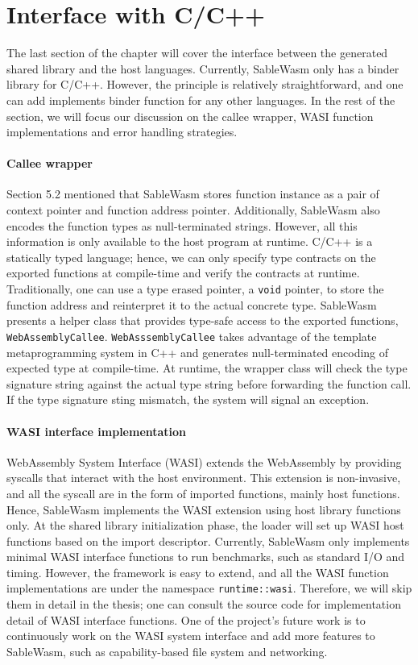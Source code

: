 \section{Interface with C/C++}
The last section of the chapter will cover the interface between the generated shared library and the host languages. Currently, SableWasm only has a binder library for C/C++. However, the principle is relatively straightforward, and one can add implements binder function for any other languages. In the rest of the section, we will focus our discussion on the callee wrapper, WASI function implementations and error handling strategies.

\paragraph{Callee wrapper}
Section 5.2 mentioned that SableWasm stores function instance as a pair of context pointer and function address pointer. Additionally, SableWasm also encodes the function types as null-terminated strings. However, all this information is only available to the host program at runtime. C/C++ is a statically typed language; hence, we can only specify type contracts on the exported functions at compile-time and verify the contracts at runtime. Traditionally, one can use a type erased pointer, a \texttt{void} pointer, to store the function address and reinterpret it to the actual concrete type.  SableWasm presents a helper class that provides type-safe access to the exported functions, \texttt{WebAssemblyCallee}. \texttt{WebAsssemblyCallee} takes advantage of the template metaprogramming system in C++ and generates null-terminated encoding of expected type at compile-time. At runtime, the wrapper class will check the type signature string against the actual type string before forwarding the function call. If the type signature sting mismatch, the system will signal an exception.

\paragraph{WASI interface implementation}
WebAssembly System Interface (WASI) extends the WebAssembly by providing syscalls that interact with the host environment. This extension is non-invasive, and all the syscall are in the form of imported functions, mainly host functions. Hence, SableWasm implements the WASI extension using host library functions only. At the shared library initialization phase, the loader will set up WASI host functions based on the import descriptor. Currently, SableWasm only implements minimal WASI interface functions to run benchmarks, such as standard I/O and timing. However, the framework is easy to extend, and all the WASI function implementations are under the namespace \texttt{runtime::wasi}. Therefore, we will skip them in detail in the thesis; one can consult the source code for implementation detail of WASI interface functions. One of the project's future work is to continuously work on the WASI system interface and add more features to SableWasm, such as capability-based file system and networking.


